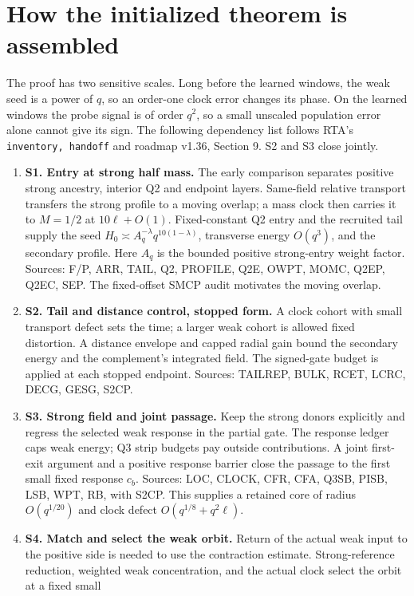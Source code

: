 \documentclass[10pt,twocolumn]{article}
\begin{document}
\section{How the initialized theorem is assembled}\label{p1thv1:architecture}
The proof has two sensitive scales. Long before the learned windows,
the weak seed is a power of \(q\), so an order-one clock error changes
its phase. On the learned windows the probe signal is of order \(q^2\),
so a small unscaled population error alone cannot give its sign.
The following dependency list follows RTA's \texttt{inventory, handoff}
and roadmap v1.36, Section 9. S2 and S3 close jointly.
\begin{enumerate}
\item \textbf{S1. Entry at strong half mass.} The early comparison
separates positive strong ancestry, interior Q2 and endpoint layers.
Same-field relative transport transfers the strong profile to a moving
overlap; a mass clock then carries it to \(M=1/2\) at \(10\ell+O(1)\).
Fixed-constant Q2 entry and the recruited tail supply the seed
\(H_0\asymp A_q^{-\lambda}q^{10(1-\lambda)}\), transverse energy
\(O(q^3)\), and the secondary profile. Here \(A_q\) is the bounded
positive strong-entry weight factor. Sources: F/P, ARR, TAIL, Q2,
PROFILE, Q2E, OWPT, MOMC, Q2EP, Q2EC, SEP. The fixed-offset SMCP
audit motivates the moving overlap.
\item \textbf{S2. Tail and distance control, stopped form.} A clock
cohort with small transport defect sets the time; a larger weak
cohort is allowed fixed distortion. A distance envelope and capped
radial gain bound the secondary energy and the complement's
integrated field. The signed-gate budget is applied at each stopped
endpoint. Sources: TAILREP, BULK, RCET, LCRC, DECG, GESG, S2CP.
\item \textbf{S3. Strong field and joint passage.} Keep the strong
donors explicitly and regress the selected weak response in the
partial gate. The response ledger caps weak energy; Q3 strip
budgets pay outside contributions. A joint first-exit argument
and a positive response barrier close the passage to the first
small fixed response \(c_b\). Sources: LOC, CLOCK, CFR, CFA, Q3SB,
PISB, LSB, WPT, RB, with S2CP. This supplies a retained core of
radius \(O(q^{1/20})\) and clock defect \(O(q^{1/8}+q^2\ell)\).
\item \textbf{S4. Match and select the weak orbit.} Return of the
actual weak input to the positive side is needed to use the
contraction estimate. Strong-reference reduction, weighted weak
concentration, and the actual clock select the orbit at a fixed small

\end{enumerate}
\end{document}
